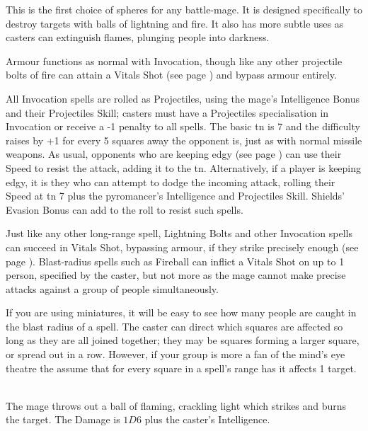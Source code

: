 
\begin{multicols}{2}

This is the first choice of spheres for any battle-mage.
It is designed specifically to destroy targets with balls of lightning and fire.
It also has more subtle uses as casters can extinguish flames, plunging people into darkness.

Armour functions as normal with Invocation, though like any other projectile bolts of fire can attain a Vitals Shot (see page \pageref{vitals}) and bypass armour entirely.

All Invocation spells are rolled as Projectiles, using the mage's Intelligence Bonus and their Projectiles Skill; casters must have a Projectiles specialisation in Invocation or receive a -1 penalty to all spells.
The basic \gls{tn} is 7 and the difficulty raises by +1 for every 5 squares away the opponent is, just as with normal missile weapons.
As usual, opponents who are keeping edgy (see page \pageref{edgy}) can use their Speed to resist the attack, adding it to the \gls{tn}.
Alternatively, if a player is keeping edgy, it is they who can attempt to dodge the incoming attack, rolling their Speed at \gls{tn} 7 plus the pyromancer's Intelligence and Projectiles Skill.
Shields' Evasion Bonus can add to the roll to resist such spells.

Just like any other long-range spell, Lightning Bolts and other Invocation spells can succeed in Vitals Shot, bypassing armour, if they strike precisely enough (see page \pageref{vitals}). Blast-radius spells such as Fireball can inflict a Vitals Shot on up to 1 person, specified by the caster, but not more as the mage cannot make precise attacks against a group of people simultaneously.

If you are using miniatures, it will be easy to see how many people are caught in the blast radius of a spell. The caster can direct which squares are affected so long as they are all joined together; they may be squares forming a larger square, or spread out in a row. However, if your group is more a fan of the mind's eye theatre the assume that for every square in a spell's range has it affects 1 target.

\spelllevel

\\
The mage throws out a ball of flaming, crackling light which strikes and burns the target. The Damage is $1D6$ plus the caster's Intelligence.


\end{multicols}
